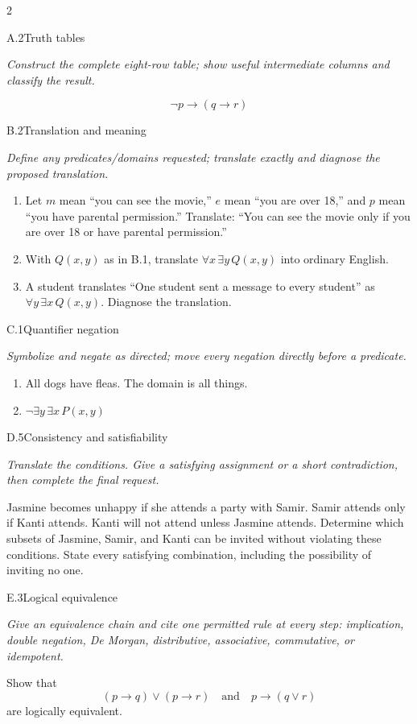 \documentclass[9pt]{extarticle}
\begin{document}
\begin{multicols}{2}
\begin{CoreProblem}{A.2}{Truth tables}
{\scriptsize\textit{Construct the complete eight-row table; show useful intermediate columns and classify the result.}\par}
\[
  \neg p\to(q\to r)
\]
\end{CoreProblem}
\begin{CoreProblem}{B.2}{Translation and meaning}
{\scriptsize\textit{Define any predicates/domains requested; translate exactly and diagnose the proposed translation.}\par}
\begin{enumerate}[label=(\alph*)]
  \item Let $m$ mean ``you can see the movie,'' $e$ mean ``you are over 18,''
        and $p$ mean ``you have parental permission.'' Translate: ``You can
        see the movie only if you are over 18 or have parental permission.''
  \item With $Q(x,y)$ as in B.1, translate $\forall x\,\exists y\,Q(x,y)$
        into ordinary English.
  \item A student translates ``One student sent a message to every student''
        as $\forall y\,\exists x\,Q(x,y)$. Diagnose the translation.
\end{enumerate}
\end{CoreProblem}
\begin{CoreProblem}{C.1}{Quantifier negation}
{\scriptsize\textit{Symbolize and negate as directed; move every negation directly before a predicate.}\par}
\begin{enumerate}[label=(\alph*)]
  \item All dogs have fleas. The domain is all things.
  \item $\neg\exists y\,\exists x\,P(x,y)$
\end{enumerate}
\end{CoreProblem}
\columnbreak
\begin{CoreProblem}{D.5}{Consistency and satisfiability}
{\scriptsize\textit{Translate the conditions. Give a satisfying assignment or a short contradiction, then complete the final request.}\par}
Jasmine becomes unhappy if she attends a party with Samir. Samir attends only
if Kanti attends. Kanti will not attend unless Jasmine attends. Determine which
subsets of Jasmine, Samir, and Kanti can be invited without violating these
conditions. State every satisfying combination, including the possibility of
inviting no one.
\end{CoreProblem}
\begin{CoreProblem}{E.3}{Logical equivalence}
{\scriptsize\textit{Give an equivalence chain and cite one permitted rule at every step: implication, double negation, De Morgan, distributive, associative, commutative, or idempotent.}\par}
Show that
\[
  (p\to q)\lor(p\to r)
  \quad\text{and}\quad
  p\to(q\lor r)
\]
are logically equivalent.
\end{CoreProblem}
\end{multicols}
\end{document}
